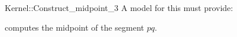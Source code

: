 \begin{ccRefFunctionObjectConcept}{Kernel::Construct_midpoint_3}
A model for this must provide:


 {computes the midpoint of the segment $pq$.}

\ccIsModel{}

\end{ccRefFunctionObjectConcept}
